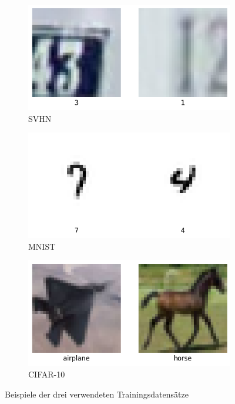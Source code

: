 \begin{figure}[h]
	\centering
	\begin{subfigure}{0.32\textwidth}
		\centering
		\includegraphics[width=\textwidth]{Bilder/svhn-examples.png}
		\caption{SVHN}
	\end{subfigure}
	\begin{subfigure}{0.32\textwidth}
		\centering
		\includegraphics[width=\textwidth]{Bilder/mnist-examples.png}
		\caption{MNIST}
	\end{subfigure}
	\begin{subfigure}{0.32\textwidth}
		\centering
		\includegraphics[width=\textwidth]{Bilder/cifar10-examples.png}
		\caption{CIFAR-10}
	\end{subfigure}
	\caption{Beispiele der drei verwendeten Trainingsdatensätze}
	\label{fig:dataset-examples}
\end{figure}

